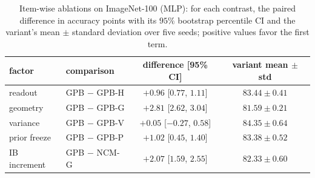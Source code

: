 \begin{table}[t]
\centering
\small
\setlength{\tabcolsep}{4pt}
\caption{Item-wise ablations on ImageNet-100 (MLP): for each contrast, the
paired difference in accuracy points with its $95\%$ bootstrap percentile CI
and the variant's mean $\pm$ standard deviation over five seeds;
positive values favor the first term.}
\label{tab:ablation-ci}
\begin{tabular}{l l c c}
\hline
factor & comparison & difference [95\% CI] & variant mean $\pm$ std \\
\hline
readout & GPB $-$ GPB-H & $+0.96$ [$0.77$, $1.11$] & $83.44\pm0.41$ \\
geometry & GPB $-$ GPB-G & $+2.81$ [$2.62$, $3.04$] & $81.59\pm0.21$ \\
variance & GPB $-$ GPB-V & $+0.05$ [$-0.27$, $0.58$] & $84.35\pm0.64$ \\
prior freeze & GPB $-$ GPB-P & $+1.02$ [$0.45$, $1.40$] & $83.38\pm0.52$ \\
IB increment & GPB $-$ NCM-G & $+2.07$ [$1.59$, $2.55$] & $82.33\pm0.60$ \\
\hline
\end{tabular}
\end{table}
